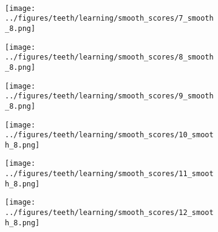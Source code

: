 \begin{figure}[h!]
	\vspace{-0.35cm}
	\\
			\begin{subfigure}[b]{0.03\textwidth} %
		\centering
	\end{subfigure}
	\begin{subfigure}{0.15\textwidth}
		\centering
		\texttt{[image: ../figures/teeth/learning/smooth\_scores/7\_smooth\_8.png]}
		\label{fig:1}
	\end{subfigure}
	\begin{subfigure}{0.15\textwidth}
		\centering
		\texttt{[image: ../figures/teeth/learning/smooth\_scores/8\_smooth\_8.png]}
		\label{fig:1}
	\end{subfigure}
	\begin{subfigure}{0.15\textwidth}
		\centering
		\texttt{[image: ../figures/teeth/learning/smooth\_scores/9\_smooth\_8.png]}
		\label{fig:1}
	\end{subfigure}
	\begin{subfigure}{0.15\textwidth}
		\centering
		\texttt{[image: ../figures/teeth/learning/smooth\_scores/10\_smooth\_8.png]}
		\label{fig:1}
	\end{subfigure}
	\begin{subfigure}{0.15\textwidth}
		\centering
		\texttt{[image: ../figures/teeth/learning/smooth\_scores/11\_smooth\_8.png]}
		\label{fig:1}
	\end{subfigure}
	\begin{subfigure}{0.15\textwidth}
		\centering
		\texttt{[image: ../figures/teeth/learning/smooth\_scores/12\_smooth\_8.png]}

\end{subfigure}
\end{figure}
